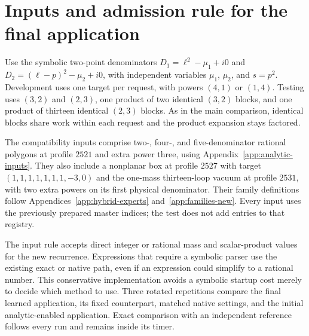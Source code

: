\section{Inputs and admission rule for the final application}
\label{app:parser-guard}
Use the symbolic two-point denominators $D_1=\ell^2-\mu_1+i0$ and $D_2=(\ell-p)^2-\mu_2+i0$, with independent variables $\mu_1$, $\mu_2$, and $s=p^2$. Development uses one target per request, with powers $(4,1)$ or $(1,4)$. Testing uses $(3,2)$ and $(2,3)$, one product of two identical $(3,2)$ blocks, and one product of thirteen identical $(2,3)$ blocks. As in the main comparison, identical blocks share work within each request and the product expansion stays factored.

The compatibility inputs comprise two-, four-, and five-denominator rational polygons at profile $2521$ and extra power three, using Appendix~\ref{app:analytic-inputs}. They also include a nonplanar box at profile $2527$ with target $(1,1,1,1,1,1,1,-3,0)$ and the one-mass thirteen-loop vacuum at profile $2531$, with two extra powers on its first physical denominator. Their family definitions follow Appendices~\ref{app:hybrid-experts} and~\ref{app:families-new}. Every input uses the previously prepared master indices; the test does not add entries to that registry.

The input rule accepts direct integer or rational mass and scalar-product values for the new recurrence. Expressions that require a symbolic parser use the existing exact or native path, even if an expression could simplify to a rational number. This conservative implementation avoids a symbolic startup cost merely to decide which method to use. Three rotated repetitions compare the final learned application, its fixed counterpart, matched native settings, and the initial analytic-enabled application. Exact comparison with an independent reference follows every run and remains inside its timer.
